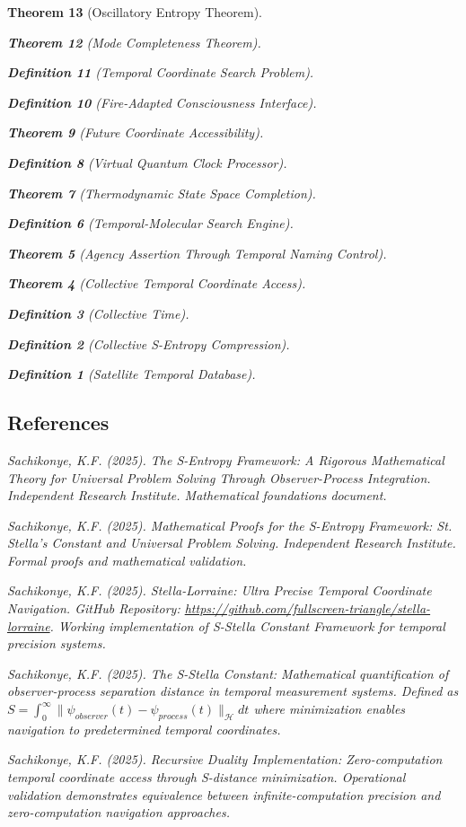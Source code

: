 \documentclass[12pt,a4paper]{article}
\newtheorem{theorem}{Theorem}[section]
\newtheorem{definition}[theorem]{Definition}
\begin{document}
\begin{theorem}[Oscillatory Entropy Theorem]
\begin{theorem}[Mode Completeness Theorem]
\begin{enumerate}
\begin{definition}[Temporal Coordinate Search Problem]
\begin{algorithm}
\begin{definition}[Fire-Adapted Consciousness Interface]
\begin{theorem}[Future Coordinate Accessibility]
\begin{definition}[Virtual Quantum Clock Processor]
\begin{itemize}
\begin{itemize}
\begin{theorem}[Thermodynamic State Space Completion]
\begin{definition}[Temporal-Molecular Search Engine]
\begin{theorem}[Agency Assertion Through Temporal Naming Control]
\begin{remark}
\begin{theorem}[Collective Temporal Coordinate Access]
\begin{definition}[Collective Time]
\begin{definition}[Collective S-Entropy Compression]
\begin{definition}[Satellite Temporal Database]
\begin{algorithm}
\begin{table}[h]
{{\section*{References}

\begin{thebibliography}{99}

Sachikonye, K.F. (2025). \textit{The S-Entropy Framework: A Rigorous Mathematical Theory for Universal Problem Solving Through Observer-Process Integration}. Independent Research Institute. Mathematical foundations document.

Sachikonye, K.F. (2025). \textit{Mathematical Proofs for the S-Entropy Framework: St. Stella's Constant and Universal Problem Solving}. Independent Research Institute. Formal proofs and mathematical validation.

Sachikonye, K.F. (2025). \textit{Stella-Lorraine: Ultra Precise Temporal Coordinate Navigation}. GitHub Repository: \url{https://github.com/fullscreen-triangle/stella-lorraine}. Working implementation of S-Stella Constant Framework for temporal precision systems.

Sachikonye, K.F. (2025). The S-Stella Constant: Mathematical quantification of observer-process separation distance in temporal measurement systems. Defined as $S = \int_0^{\infty} \|\psi_{observer}(t) - \psi_{process}(t)\|_{\mathcal{H}} dt$ where minimization enables navigation to predetermined temporal coordinates.

Sachikonye, K.F. (2025). Recursive Duality Implementation: Zero-computation temporal coordinate access through S-distance minimization. Operational validation demonstrates equivalence between infinite-computation precision and zero-computation navigation approaches.


\end{thebibliography}}}
\end{table}
\end{algorithm}
\end{definition}
\end{definition}
\end{definition}
\end{theorem}
\end{remark}
\end{theorem}
\end{definition}
\end{theorem}
\end{itemize}
\end{itemize}
\end{definition}
\end{theorem}
\end{definition}
\end{algorithm}
\end{definition}
\end{enumerate}
\end{theorem}
\end{theorem}
\end{document}
